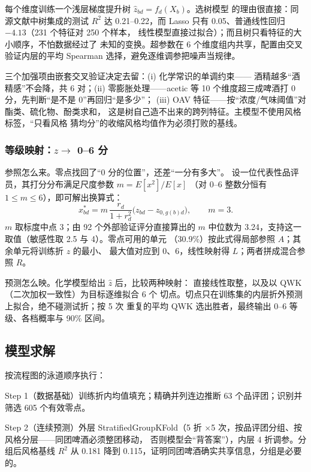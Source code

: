 \documentclass[12pt,a4paper]{article}
\begin{document}
每个维度训练一个浅层梯度提升树 $\hat z_{bd}=f_d(X_b)$。选树模型
的理由很直接：同源文献中树集成的测试 $R^2$ 达 0.21--0.22，而
Lasso 只有 0.05、普通线性回归 $-4.13$（231 个特征对 250 个样本，
线性模型直接过拟合）；而且树只看特征的大小顺序，不怕数据经过了
未知的变换。超参数在 6 个维度组内共享，配置由交叉验证内层的平均
Spearman 选择，避免逐维调参把噪声当规律。

三个加强项由嵌套交叉验证决定去留：(i) 化学常识的单调约束——
酒精越多``酒精感''不会降，共 6 对；(ii) 零膨胀处理——acetic 等
10 个维度超三成啤酒打 0 分，先判断``是不是 0''再回归``是多少''；
(iii) OAV 特征——按``浓度/气味阈值''对酯类、硫化物、酚类求和，
这是树自己造不出来的跨列特征。主模型不使用风格标签，``只看风格
猜均分''的收缩风格均值作为必须打败的基线。

\subsubsection{等级映射：$z\to$ 0--6 分}

参照怎么来。零点找回了``0 分的位置''，还差``一分有多大''。
设一位代表性品评员，其打分分布满足尺度参数 $m=E[x^2]/E[x]$
（对 0--6 整数分恒有 $1\le m\le6$），即可解出换算式：
\begin{equation}
  x^*_{bd}=m\,\frac{r_d}{1+r_d^2}\bigl(z_{bd}-z_{0,g(b)d}\bigr),
  \qquad m=3 .
\end{equation}
$m$ 取标度中点 3；由 92 个外部验证评分直接算出的 $m$ 中位数为
3.24，支持这一取值（敏感性取 2.5 与 4）。零点可用的单元
（30.9\%）按此式得局部参照 $A$；其余单元将训练折 $z$ 的最小、
最大值对应到 0、6，线性映射得 $L$；两者拼成混合参照 $R$。

预测怎么映。化学模型给出 $\hat z$ 后，比较两种映射：
直接线性取整，以及以 QWK（二次加权一致性）为目标逐维拟合 6 个
切点。切点只在训练集的内层折外预测上拟合，绝不碰测试折；按 5 次
重复的平均 QWK 选出胜者，最终输出 0--6 等级、各档概率与 90\%
区间。

\subsection{模型求解}

按流程图的泳道顺序执行：

Step 1（数据基础）训练折内均值填充；精确并列连边推断
63 个品评团；识别并筛选 605 个有效零点。

Step 2（连续预测）外层 StratifiedGroupKFold（5 折
$\times$5 次，按品评团分组、按风格分层——同团啤酒必须整团移动，
否则模型会``背答案''），内层 4 折调参。分组后风格基线 $R^2$ 从
0.181 降到 0.115，证明同团啤酒确实共享信息，分组是必要的。
\end{document}
